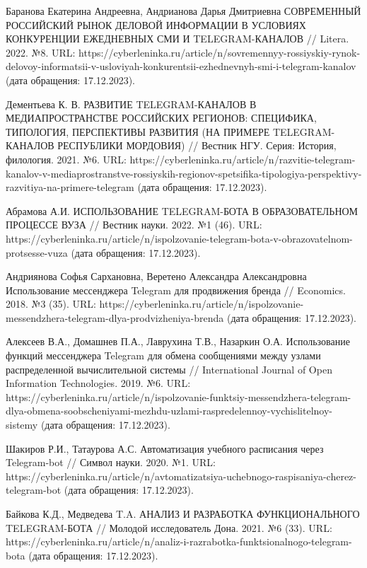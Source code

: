 \documentclass{article}
\begin{document}
Баранова Екатерина Андреевна, Андрианова Дарья Дмитриевна СОВРЕМЕННЫЙ РОССИЙСКИЙ РЫНОК ДЕЛОВОЙ ИНФОРМАЦИИ В УСЛОВИЯХ КОНКУРЕНЦИИ ЕЖЕДНЕВНЫХ СМИ И TELEGRAM-КАНАЛОВ // Litera. 2022. №8. URL: https://cyberleninka.ru/article/n/sovremennyy-rossiyskiy-rynok-delovoy-informatsii-v-usloviyah-konkurentsii-ezhednevnyh-smi-i-telegram-kanalov (дата обращения: 17.12.2023).

Дементьева К. В. РАЗВИТИЕ TELEGRAM-КАНАЛОВ В МЕДИАПРОСТРАНСТВЕ РОССИЙСКИХ РЕГИОНОВ: СПЕЦИФИКА, ТИПОЛОГИЯ, ПЕРСПЕКТИВЫ РАЗВИТИЯ (НА ПРИМЕРЕ TELEGRAM-КАНАЛОВ РЕСПУБЛИКИ МОРДОВИЯ) // Вестник НГУ. Серия: История, филология. 2021. №6. URL: https://cyberleninka.ru/article/n/razvitie-telegram-kanalov-v-mediaprostranstve-rossiyskih-regionov-spetsifika-tipologiya-perspektivy-razvitiya-na-primere-telegram (дата обращения: 17.12.2023).

Абрамова А.И. ИСПОЛЬЗОВАНИЕ TELEGRAM-БОТА В ОБРАЗОВАТЕЛЬНОМ ПРОЦЕССЕ ВУЗА // Вестник науки. 2022. №1 (46). URL: https://cyberleninka.ru/article/n/ispolzovanie-telegram-bota-v-obrazovatelnom-protsesse-vuza (дата обращения: 17.12.2023).

Андриянова Софья Сархановна, Веретено Александра Александровна Использование мессенджера Telegram для продвижения бренда // Economics. 2018. №3 (35). URL: https://cyberleninka.ru/article/n/ispolzovanie-messendzhera-telegram-dlya-prodvizheniya-brenda (дата обращения: 17.12.2023).

Алексеев В.А., Домашнев П.А., Лаврухина Т.В., Назаркин О.А. Использование функций мессенджера Telegram для обмена сообщениями между узлами распределенной вычислительной системы // International Journal of Open Information Technologies. 2019. №6. URL: https://cyberleninka.ru/article/n/ispolzovanie-funktsiy-messendzhera-telegram-dlya-obmena-soobscheniyami-mezhdu-uzlami-raspredelennoy-vychislitelnoy-sistemy (дата обращения: 17.12.2023).

Шакиров Р.И., Татаурова А.С. Автоматизация учебного расписания через Telegram-bot // Символ науки. 2020. №1. URL: https://cyberleninka.ru/article/n/avtomatizatsiya-uchebnogo-raspisaniya-cherez-telegram-bot (дата обращения: 17.12.2023).

Байкова К.Д., Медведева T.A. АНАЛИЗ И РАЗРАБОТКА ФУНКЦИОНАЛЬНОГО TELEGRAM-БОТА // Молодой исследователь Дона. 2021. №6 (33). URL: https://cyberleninka.ru/article/n/analiz-i-razrabotka-funktsionalnogo-telegram-bota (дата обращения: 17.12.2023).
\end{document}
